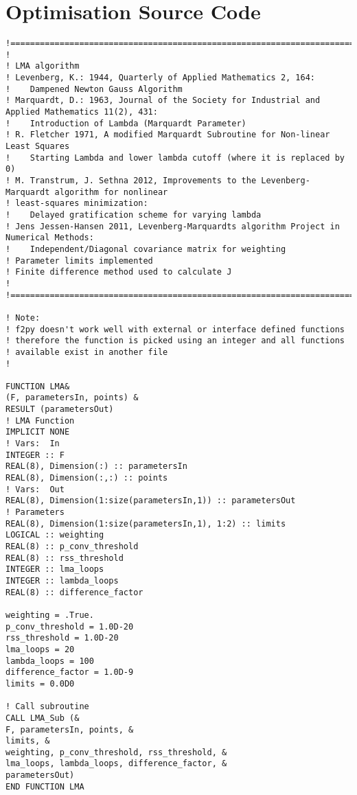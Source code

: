 \chapter{Optimisation Source Code}




\begin{lstlisting}[style=sFortran,caption={Add two numbers function}]
!=================================================================================================
!
! LMA algorithm
! Levenberg, K.: 1944, Quarterly of Applied Mathematics 2, 164:
!    Dampened Newton Gauss Algorithm
! Marquardt, D.: 1963, Journal of the Society for Industrial and Applied Mathematics 11(2), 431:
!    Introduction of Lambda (Marquardt Parameter)
! R. Fletcher 1971, A modified Marquardt Subroutine for Non-linear Least Squares
!    Starting Lambda and lower lambda cutoff (where it is replaced by 0)
! M. Transtrum, J. Sethna 2012, Improvements to the Levenberg-Marquardt algorithm for nonlinear
! least-squares minimization:
!    Delayed gratification scheme for varying lambda
! Jens Jessen-Hansen 2011, Levenberg-Marquardts algorithm Project in Numerical Methods:
!    Independent/Diagonal covariance matrix for weighting
! Parameter limits implemented
! Finite difference method used to calculate J
!
!=================================================================================================

! Note:
! f2py doesn't work well with external or interface defined functions
! therefore the function is picked using an integer and all functions
! available exist in another file
!

FUNCTION LMA&
(F, parametersIn, points) &
RESULT (parametersOut)
! LMA Function
IMPLICIT NONE
! Vars:  In
INTEGER :: F
REAL(8), Dimension(:) :: parametersIn
REAL(8), Dimension(:,:) :: points
! Vars:  Out
REAL(8), Dimension(1:size(parametersIn,1)) :: parametersOut
! Parameters
REAL(8), Dimension(1:size(parametersIn,1), 1:2) :: limits
LOGICAL :: weighting
REAL(8) :: p_conv_threshold
REAL(8) :: rss_threshold
INTEGER :: lma_loops
INTEGER :: lambda_loops
REAL(8) :: difference_factor

weighting = .True.
p_conv_threshold = 1.0D-20
rss_threshold = 1.0D-20
lma_loops = 20
lambda_loops = 100
difference_factor = 1.0D-9
limits = 0.0D0

! Call subroutine
CALL LMA_Sub (&
F, parametersIn, points, &
limits, &
weighting, p_conv_threshold, rss_threshold, &
lma_loops, lambda_loops, difference_factor, &
parametersOut)
END FUNCTION LMA



\end{lstlisting}
